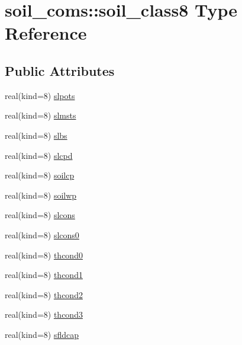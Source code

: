 \hypertarget{structsoil__coms_1_1soil__class8}{}\section{soil\+\_\+coms\+:\+:soil\+\_\+class8 Type Reference}
\label{structsoil__coms_1_1soil__class8}
\subsection*{Public Attributes}
\begin{DoxyCompactItemize}
\item 
real(kind=8) \hyperlink{structsoil__coms_1_1soil__class8_a0db3756007c4b365d4cc816c85c68e87}{slpots}
\item 
real(kind=8) \hyperlink{structsoil__coms_1_1soil__class8_a827d9a9a6493846f2c27bf315c732a22}{slmsts}
\item 
real(kind=8) \hyperlink{structsoil__coms_1_1soil__class8_ad2aaa2b7e20f2b6e0fd7346d7dba36c8}{slbs}
\item 
real(kind=8) \hyperlink{structsoil__coms_1_1soil__class8_a7f69d5e15678d754e43256681d09a81a}{slcpd}
\item 
real(kind=8) \hyperlink{structsoil__coms_1_1soil__class8_a4a80dd61d096c8335a2c9a147e703e83}{soilcp}
\item 
real(kind=8) \hyperlink{structsoil__coms_1_1soil__class8_abba0d916f641d061902129070cf12a82}{soilwp}
\item 
real(kind=8) \hyperlink{structsoil__coms_1_1soil__class8_aca739f925f6f52452efcd94cab49867a}{slcons}
\item 
real(kind=8) \hyperlink{structsoil__coms_1_1soil__class8_aa300207fe531601c4d8a09ce743a9b43}{slcons0}
\item 
real(kind=8) \hyperlink{structsoil__coms_1_1soil__class8_a141c2117cc2bf145427850ce5e4b78be}{thcond0}
\item 
real(kind=8) \hyperlink{structsoil__coms_1_1soil__class8_a5a8b1c90441032b7c24b0e320aa2776b}{thcond1}
\item 
real(kind=8) \hyperlink{structsoil__coms_1_1soil__class8_ae567a21fc4cba911ff6f3b303b17c113}{thcond2}
\item 
real(kind=8) \hyperlink{structsoil__coms_1_1soil__class8_ac4a0e67d9964ec4e4d30f01b343d2781}{thcond3}
\item 
real(kind=8) \hyperlink{structsoil__coms_1_1soil__class8_a547e100b3580e0636f85111c5eefc993}{sfldcap}
\item 

\end{DoxyCompactItemize}
